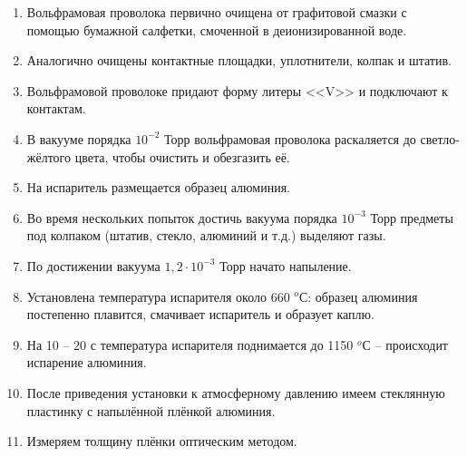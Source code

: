 \documentclass[a4paper, 14pt]{extarticle}
\begin{document}
	\begin{enumerate}
		\item Вольфрамовая проволока первично очищена от графитовой смазки с помощью бумажной салфетки, смоченной в деионизированной воде.
		
		\item Аналогично очищены контактные площадки, уплотнители, колпак и штатив.
		
		\item  Вольфрамовой проволоке придают форму литеры <<V>> и подключают к контактам. 
		
		\item  В вакууме порядка $10^{-2}$ Торр вольфрамовая проволока раскаляется до светло-жёлтого цвета, чтобы очистить и обезгазить её.
		
		\item На испаритель размещается образец алюминия.
		
		\item  Во время нескольких попыток достичь вакуума порядка $10^{-3}$ Торр предметы под колпаком (штатив, стекло, алюминий и т.д.) выделяют газы.
		
		\item  По достижении вакуума $1, 2 \cdot 10^{-3}$ Торр начато напыление.
		
		\item  Установлена температура испарителя около 660 $^o$С: образец алюминия постепенно плавится, смачивает испаритель и образует каплю.
		
		\item  На 10 -- 20 с температура испарителя поднимается до 1150 $^o$С -- происходит испарение алюминия.
		
		\item  После приведения установки к атмосферному давлению имеем стеклянную пластинку с напылённой плёнкой алюминия.
		
		\item  Измеряем толщину плёнки оптическим методом.
		
		
		
		
		
		
		
		
	\end{enumerate} 
		
		
		
			
			
		
		
	
	
	
	
	
	
\end{document}
